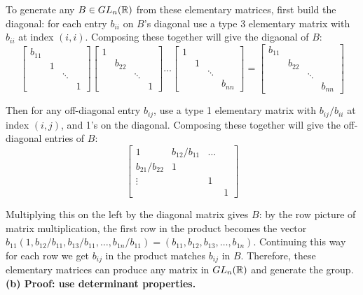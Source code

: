 \documentclass{article}
\begin{document}
To generate any $B \in GL_n(\mathbb{R})$ from these elementary matrices, first build the diagonal: for each entry $b_{ii}$ on $B$'s diagonal use a type 3 elementary matrix with $b_{ii}$ at index $(i,i)$. Composing these together will give the digaonal of $B$:
$$\begin{bmatrix}b_{11} & & & \\ & 1  & & \\ & & \ddots & \\ & & & 1\end{bmatrix}
    \begin{bmatrix}1 & & & \\ & b_{22}  & & \\ & & \ddots & \\ & & & 1\end{bmatrix}
    \ldots
    \begin{bmatrix}1 & & & \\ &1  & & \\ & & \ddots & \\ & & & b_{nn}\end{bmatrix}
    = \begin{bmatrix}b_{11} & & & \\ & b_{22}  & & \\ & & \ddots & \\ & & & b_{nn}\end{bmatrix}$$

Then for any off-diagonal entry $b_{ij}$, use a type 1 elementary matrix with $b_{ij} / b_{ii}$ at index $(i,j)$, and 1's on the diagonal. Composing these together will give the off-diagonal entries of $B$:
$$\begin{bmatrix}1 & b_{12} / b_{11} & \ldots & \\ b_{21} / b_{22} & 1  & & \\ \vdots & & 1 & \\ & & & 1\end{bmatrix}$$

Multiplying this on the left by the diagonal matrix gives $B$: by the row picture of matrix multiplication, the first row in the product becomes the vector $b_{11}(1, b_{12} / b_{11}, b_{13} / b_{11}, \ldots , b_{1n} / b_{11}) = (b_{11}, b_{12}, b_{13}, \ldots, b_{1n})$. Continuing this way for each row we get $b_{ij}$ in the product matches $b_{ij}$ in $B$. Therefore, these elementary matrices can produce any matrix in $GL_n(\mathbb{R})$ and generate the group.
\\

\textbf{(b) Proof: use determinant properties.}
\\
\end{document}
